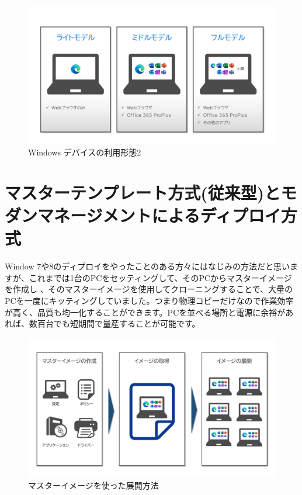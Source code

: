 \begin{figure}[htbp]
    \centering
    \includegraphics[width=12cm]{figures/HowtoUsePC-2.png}
    \caption{Windows デバイスの利用形態2}
    \label{fig:Windowデバイスの利用形態2}
\end{figure}

\section{マスターテンプレート方式(従来型)とモダンマネージメントによるディプロイ方式}

Window 7や8のディプロイをやったことのある方々にはなじみの方法だと思いますが、これまでは1台のPCをセッティングして、そのPCからマスターイメージを作成し
、そのマスターイメージを使用してクローニングすることで、大量のPCを一度にキッティングしていました。つまり物理コピーだけなので作業効率が高く、品質も均一化することができます。PCを並べる場所と電源に余裕があれば、数百台でも短期間で量産することが可能です。


\begin{figure}[htbp]
    \centering
    \includegraphics[width=12cm]{figures/MasterImage.png}
    \caption{マスターイメージを使った展開方法}
    \label{fig:MasterImage}
\end{figure}

